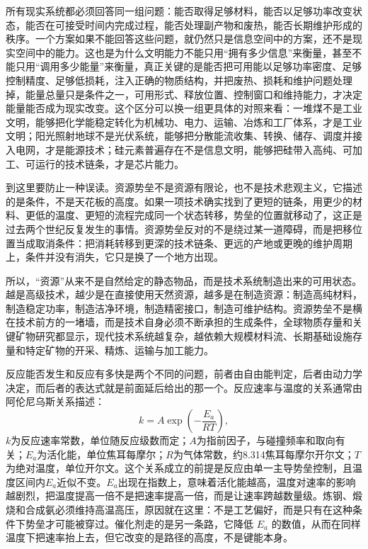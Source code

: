所有现实系统都必须回答同一组问题：能否取得足够材料，能否以足够功率改变状态，能否在可接受时间内完成过程，能否处理副产物和废热，能否长期维护形成的秩序。一个方案如果不能回答这些问题，就仍然只是信息空间中的方案，还不是现实空间中的能力。这也是为什么文明能力不能只用“拥有多少信息”来衡量，甚至不能只用“调用多少能量”来衡量，真正关键的是能否把可用能以足够功率密度、足够控制精度、足够低损耗，注入正确的物质结构，并把废热、损耗和维护问题处理掉，能量总量只是条件之一，可用形式、释放位置、控制窗口和维持能力，才决定能量能否成为现实改变。这个区分可以换一组更具体的对照来看：一堆煤不是工业文明，能够把化学能稳定转化为机械功、电力、运输、冶炼和工厂体系，才是工业文明；阳光照射地球不是光伏系统，能够把分散能流收集、转换、储存、调度并接入电网，才是能源技术；硅元素普遍存在不是信息文明，能够把硅带入高纯、可加工、可运行的技术链条，才是芯片能力。

到这里要防止一种误读。资源势垒不是资源有限论，也不是技术悲观主义，它描述的是条件，不是天花板的高度。如果一项技术确实找到了更短的链条，用更少的材料、更低的温度、更短的流程完成同一个状态转移，势垒的位置就移动了，这正是过去两个世纪反复发生的事情。资源势垒反对的不是绕过某一道障碍，而是把移位置当成取消条件：把消耗转移到更深的技术链条、更远的产地或更晚的维护周期上，条件并没有消失，它只是换了一个地方出现。

所以，“资源”从来不是自然给定的静态物品，而是技术系统制造出来的可用状态。越是高级技术，越少是在直接使用天然资源，越多是在制造资源：制造高纯材料，制造稳定功率，制造洁净环境，制造精密接口，制造可维护结构。资源势垒不是横在技术前方的一堵墙，而是技术自身必须不断承担的生成条件，全球物质存量和关键矿物研究都显示，现代技术系统越复杂，越依赖大规模材料流、长期基础设施存量和特定矿物的开采、精炼、运输与加工能力。\cite{krausmann2017global,iea2021criticalminerals}


反应能否发生和反应有多快是两个不同的问题，前者由自由能判定，后者由动力学决定，而后者的表达式就是前面延后给出的那一个。反应速率与温度的关系通常由阿伦尼乌斯关系描述：
\begin{equation}
k=A\exp\!\left(-\frac{E_a}{RT}\right),
\label{eq:arrhenius}
\end{equation}
$k$为反应速率常数，单位随反应级数而定；$A$为指前因子，与碰撞频率和取向有关；$E_a$为活化能，单位焦耳每摩尔；$R$为气体常数，约8.314焦耳每摩尔开尔文；$T$为绝对温度，单位开尔文。这个关系成立的前提是反应由单一主导势垒控制，且温度区间内$E_a$近似不变。$E_a$出现在指数上，意味着活化能越高，温度对速率的影响越剧烈，把温度提高一倍不是把速率提高一倍，而是让速率跨越数量级。炼钢、煅烧和合成氨必须维持高温高压，原因就在这里：不是工艺偏好，而是只有在这种条件下势垒才可能被穿过。催化剂走的是另一条路，它降低 $E_a$ 的数值，从而在同样温度下把速率抬上去，但它改变的是路径的高度，不是键能本身。

